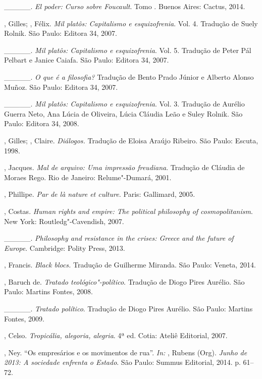 \begin{Parskip}
\_\_\_\_\_. \emph{El poder: Curso sobre Foucault}. Tomo . Buenos
Aires: Cactus, 2014.

, Gilles; , Félix. \emph{Mil platôs: Capitalismo e
esquizofrenia}. Vol. 4. Tradução de Suely Rolnik. São Paulo: Editora 34, 2007.

\_\_\_\_\_. \emph{Mil platôs: Capitalismo e
esquizofrenia}. Vol. 5. Tradução de Peter Pál Pelbart e Janice Caiafa.
São Paulo: Editora 34, 2007.

\_\_\_\_\_. \emph{O que é a filosofia? }Tradução de
Bento Prado Júnior e Alberto Alonso Muñoz. São Paulo: Editora 34, 2007.

\_\_\_\_\_. \emph{Mil platôs: Capitalismo e
esquizofrenia}. Vol. 3. Tradução de Aurélio Guerra Neto, Ana Lúcia de
Oliveira, Lúcia Cláudia Leão e Suley Rolnik. São Paulo: Editora 34, 2008.

, Gilles; , Claire. \emph{Diálogos.} Tradução de Eloisa
Araújo Ribeiro. São Paulo: Escuta, 1998.

, Jacques. \emph{Mal de arquivo: Uma impressão freudiana}.
Tradução de Cláudia de Moraes Rego. Rio de Janeiro: Relume"-Dumará, 2001.

, Phillipe. \emph{Par de là nature et culture. }Paris:
Gallimard, 2005.

, Costas. \emph{Human rights and empire: The political
philosophy of cosmopolitanism}. New York: Routledg"-Cavendish, 2007.

\_\_\_\_\_. \emph{Philosophy and resistance in the crises:
Greece and the future of Europe}. Cambridge: Polity Press, 2013.

, Francis. \emph{Black blocs. }Tradução de Guilherme
Miranda. São Paulo: Veneta, 2014.

, Baruch de. \emph{Tratado teológico"-político}. Tradução
de Diogo Pires Aurélio. São Paulo: Martins Fontes, 2008.

\_\_\_\_\_. \emph{Tratado político}. Tradução de Diogo Pires
Aurélio. São Paulo: Martins Fontes, 2009.

, Celso. \emph{Tropicália, alegoria, alegria}. 4ª ed.
Cotia: Ateliê Editorial, 2007.

, Ney. ``Os empresários e os movimentos de rua''. \emph{In:} 
, Rubens (Org). \emph{Junho de 2013: A sociedade enfrenta o
Estado}. São Paulo: Summus Editorial, 2014. p. 61--72.


\end{Parskip}
